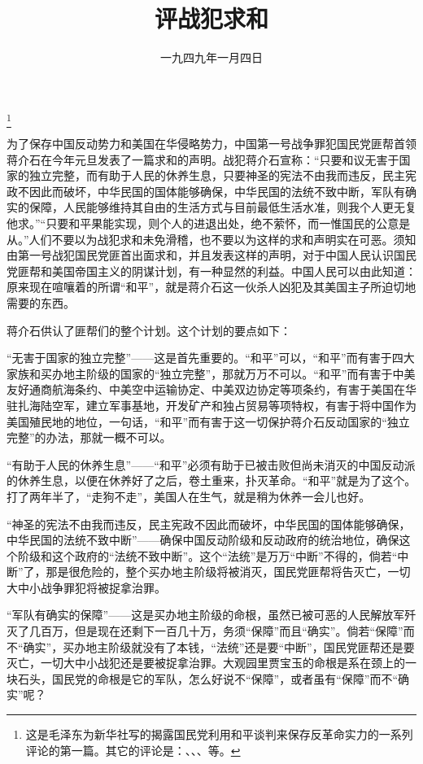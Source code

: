 
\title{评战犯求和}
\date{一九四九年一月四日}
\thanks{这是毛泽东为新华社写的揭露国民党利用和平谈判来保存反革命实力的一系列评论的第一篇。其它的评论是：、、、等。}
\maketitle


为了保存中国反动势力和美国在华侵略势力，中国第一号战争罪犯国民党匪帮首领蒋介石在今年元旦发表了一篇求和的声明。战犯蒋介石宣称：“只要和议无害于国家的独立完整，而有助于人民的休养生息，只要神圣的宪法不由我而违反，民主宪政不因此而破坏，中华民国的国体能够确保，中华民国的法统不致中断，军队有确实的保障，人民能够维持其自由的生活方式与目前最低生活水准，则我个人更无复他求。”“只要和平果能实现，则个人的进退出处，绝不萦怀，而一惟国民的公意是从。”人们不要以为战犯求和未免滑稽，也不要以为这样的求和声明实在可恶。须知由第一号战犯国民党匪首出面求和，并且发表这样的声明，对于中国人民认识国民党匪帮和美国帝国主义的阴谋计划，有一种显然的利益。中国人民可以由此知道：原来现在喧嚷着的所谓“和平”，就是蒋介石这一伙杀人凶犯及其美国主子所迫切地需要的东西。

蒋介石供认了匪帮们的整个计划。这个计划的要点如下：

“无害于国家的独立完整”——这是首先重要的。“和平”可以，“和平”而有害于四大家族和买办地主阶级的国家的“独立完整”，那就万万不可以。“和平”而有害于中美友好通商航海条约、中美空中运输协定、中美双边协定等项条约，有害于美国在华驻扎海陆空军，建立军事基地，开发矿产和独占贸易等项特权，有害于将中国作为美国殖民地的地位，一句话，“和平”而有害于这一切保护蒋介石反动国家的“独立完整”的办法，那就一概不可以。

“有助于人民的休养生息”——“和平”必须有助于已被击败但尚未消灭的中国反动派的休养生息，以便在休养好了之后，卷土重来，扑灭革命。“和平”就是为了这个。打了两年半了，“走狗不走”，美国人在生气，就是稍为休养一会儿也好。

“神圣的宪法不由我而违反，民主宪政不因此而破坏，中华民国的国体能够确保，中华民国的法统不致中断”——确保中国反动阶级和反动政府的统治地位，确保这个阶级和这个政府的“法统不致中断”。这个“法统”是万万“中断”不得的，倘若“中断”了，那是很危险的，整个买办地主阶级将被消灭，国民党匪帮将告灭亡，一切大中小战争罪犯将被捉拿治罪。

“军队有确实的保障”——这是买办地主阶级的命根，虽然已被可恶的人民解放军歼灭了几百万，但是现在还剩下一百几十万，务须“保障”而且“确实”。倘若“保障”而不“确实”，买办地主阶级就没有了本钱，“法统”还是要“中断”，国民党匪帮还是要灭亡，一切大中小战犯还是要被捉拿治罪。大观园里贾宝玉的命根是系在颈上的一块石头，国民党的命根是它的军队，怎么好说不“保障”，或者虽有“保障”而不“确实”呢？


